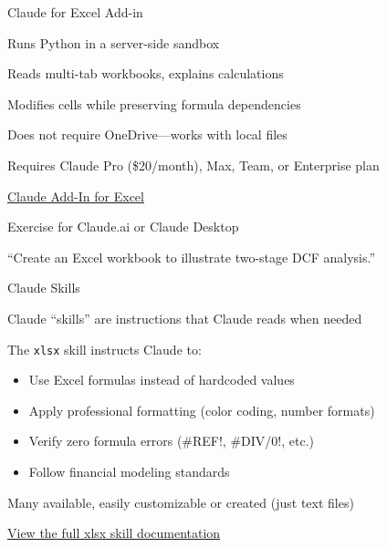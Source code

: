 \documentclass[aspectratio=169]{beamer}
\begin{document}
\begin{frame}{Claude for Excel Add-in}
\begin{baritemize}
  \item Runs Python in a server-side sandbox
  \item Reads multi-tab workbooks, explains calculations
  \item Modifies cells while preserving formula dependencies
  \item \alert{Does not require OneDrive}---works with local files
  \item Requires Claude Pro (\$20/month), Max, Team, or Enterprise plan
\end{baritemize}
\vspace{0.3cm}
\begin{shadedbox}
\centerline{
  \href{https://marketplace.microsoft.com/en-us/product/saas/wa200009404?tab=overview}{Claude Add-In for Excel}
}
\end{shadedbox}
\end{frame}




\begin{frame}{Exercise for Claude.ai or Claude Desktop}
  
\begin{shadedbox}
\centerline{``Create an Excel workbook to illustrate two-stage DCF analysis.''}
\end{shadedbox}
\end{frame}

\begin{frame}{Claude Skills}
\begin{baritemize}
  \item Claude ``skills'' are instructions that Claude reads when needed
  \item The \texttt{xlsx} skill instructs Claude to:
  \begin{itemize}
    \item Use Excel formulas instead of hardcoded values
    \item Apply professional formatting (color coding, number formats)
    \item Verify zero formula errors (\#REF!, \#DIV/0!, etc.)
    \item Follow financial modeling standards
  \end{itemize}
  \item Many available, easily customizable or created (just text files)
  \item \href{https://github.com/anthropics/claude-code/blob/main/skills/xlsx/skill.md}{View the full xlsx skill documentation}
\end{baritemize}
\end{frame}
\end{document}
